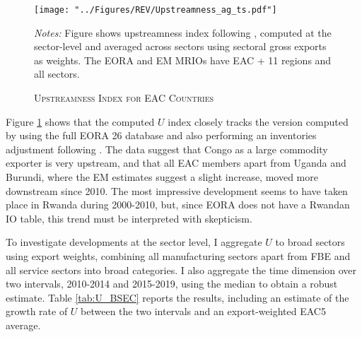 \documentclass[a4paper]{article}
\begin{document}
\begin{figure}[h!]
\centering
\caption{\label{fig:EACUS_ag_ts}\textsc{Upstreamness Index for EAC Countries}}
\texttt{[image: "../Figures/REV/Upstreamness\_ag\_ts.pdf"]} \\ %
\raggedright
\scriptsize
\emph{Notes:} Figure shows upstreamness index following \citet{antras2012measuring}, computed at the sector-level and averaged across sectors using sectoral gross exports as weights. The EORA and EM MRIOs have EAC + 11 regions and all sectors.  
\vspace{4mm}
\end{figure}
\FloatBarrier


Figure \ref{fig:EACUS_ag_ts} shows that the computed $U$ index closely tracks the version computed by \citep{mancini2023positioning} using the full EORA 26 database and also performing an inventories adjustment following \citet{antras2018measurement}. The data suggest that Congo as a large commodity exporter is very upstream, and that all EAC members apart from Uganda and Burundi, where the EM estimates suggest a slight increase, moved more downstream since 2010. The most impressive development seems to have taken place in Rwanda during 2000-2010, but, since EORA does not have a Rwandan IO table, this trend must be interpreted with skepticism. \newline

To investigate developments at the sector level, I aggregate $U$ to broad sectors using export weights, combining all manufacturing sectors apart from FBE and all service sectors into broad categories. I also aggregate the time dimension over two intervals, 2010-2014 and 2015-2019, using the median to obtain a robust estimate. Table \ref{tab:U_BSEC} reports the results, including an estimate of the growth rate of $U$ between the two intervals and an export-weighted EAC5 average. \newline 
\end{document}
